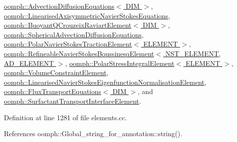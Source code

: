 \hyperlink{classoomph_1_1AdvectionDiffusionEquations_aed50fe00556434c01bc855766edeb564}{oomph\+::\+Advection\+Diffusion\+Equations$<$ D\+I\+M $>$}, \hyperlink{classoomph_1_1LinearisedAxisymmetricNavierStokesEquations_a3dc10c4b27bee432c8536a7213c70050}{oomph\+::\+Linearised\+Axisymmetric\+Navier\+Stokes\+Equations}, \hyperlink{classoomph_1_1BuoyantQCrouzeixRaviartElement_a7d22156d87949e4c64d597d60fe00225}{oomph\+::\+Buoyant\+Q\+Crouzeix\+Raviart\+Element$<$ D\+I\+M $>$}, \hyperlink{classoomph_1_1SphericalAdvectionDiffusionEquations_a7aeb7cc67f60d713fd64321004229401}{oomph\+::\+Spherical\+Advection\+Diffusion\+Equations}, \hyperlink{classoomph_1_1PolarNavierStokesTractionElement_ab3d5f0fb4c4a3c9330ce0b3d99efd321}{oomph\+::\+Polar\+Navier\+Stokes\+Traction\+Element$<$ E\+L\+E\+M\+E\+N\+T $>$}, \hyperlink{classoomph_1_1RefineableNavierStokesBoussinesqElement_a02e9c7f347aa1c6defbcb20049fc8985}{oomph\+::\+Refineable\+Navier\+Stokes\+Boussinesq\+Element$<$ N\+S\+T\+\_\+\+E\+L\+E\+M\+E\+N\+T, A\+D\+\_\+\+E\+L\+E\+M\+E\+N\+T $>$}, \hyperlink{classoomph_1_1PolarStressIntegralElement_a2e8896b4e1e698caa3460dd41da55cb8}{oomph\+::\+Polar\+Stress\+Integral\+Element$<$ E\+L\+E\+M\+E\+N\+T $>$}, \hyperlink{classoomph_1_1VolumeConstraintElement_af2a5a59f7fa5f2570d2d490f3610de61}{oomph\+::\+Volume\+Constraint\+Element}, \hyperlink{classoomph_1_1LinearisedNavierStokesEigenfunctionNormalisationElement_a2ccaac6c10a84733c6efab8890d3f048}{oomph\+::\+Linearised\+Navier\+Stokes\+Eigenfunction\+Normalisation\+Element}, \hyperlink{classoomph_1_1FluxTransportEquations_ac3c3ab10011367a880104ec6d05ab9a9}{oomph\+::\+Flux\+Transport\+Equations$<$ D\+I\+M $>$}, and \hyperlink{classoomph_1_1SurfactantTransportInterfaceElement_a7c0f9b63cea887a4a65abbe9aeb3b3cf}{oomph\+::\+Surfactant\+Transport\+Interface\+Element}.



Definition at line 1281 of file elements.\+cc.



References oomph\+::\+Global\+\_\+string\+\_\+for\+\_\+annotation\+::string().



